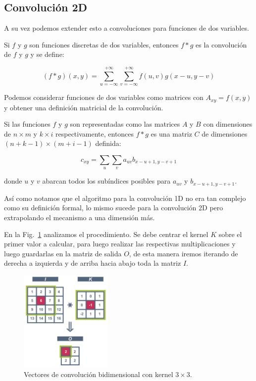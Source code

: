 \documentclass[a4paper,12pt]{article}
\begin{document}
\subsection{Convolución 2D}

A su vez podemos extender esto a convoluciones para funciones de dos variables.

Si $f$ y $g$ son funciones discretas de dos variables, entonces $f*g$ es la convolución de $f$ y $g$ y se define:

$$
(f*g)(x,y) = \sum_{u=-\infty}^{+\infty} \sum_{v=-\infty}^{+\infty} f(u,v)g(x-u,y-v)
$$

Podemos considerar funciones de dos variables como matrices con $A_{xy} = f(x,y)$ y obtener una definición matricial de la convolución.

Si las funciones $f$ y $g$ son representadas como las matrices $A$ y $B$ con dimensiones de $n \times m$ y $k \times i$ respectivamente, entonces $f*g$ es una matriz $C$ de dimensiones $(n+k-1) \times (m+i-1)$ definida:

$$
c_{xy} = \sum_{u} \sum_{v} a_{uv} b_{x-u+1,y-v+1}
$$

donde $u$ y $v$ abarcan todos los subíndices posibles para $a_{uv}$ y $b_{x-u+1,y-v+1}$.

Así como notamos que el algoritmo para la convolución 1D no era tan complejo como su definición formal, lo mismo sucede para la convolución 2D pero extrapolando el mecanismo a una dimensión más.

En la Fig.~\ref{fig:conv2d} \citep{andrianaivo2019architecture} analizamos el procedimiento. Se debe centrar el kernel $K$ sobre el primer valor a calcular, para luego realizar las respectivas multiplicaciones y luego guardarlas en la matriz de salida $O$, de esta manera iremos iterando de derecha a izquierda y de arriba hacia abajo toda la matriz $I$.

\begin{figure}[H]
	\begin{center}				
	\includegraphics[width=0.4\textwidth]{convolution2d.jpg}
  	\caption{Vectores de convolución bidimensional con kernel $3 \times 3$.}
  	\label{fig:conv2d}
  	\end{center}
\end{figure}
\end{document}
